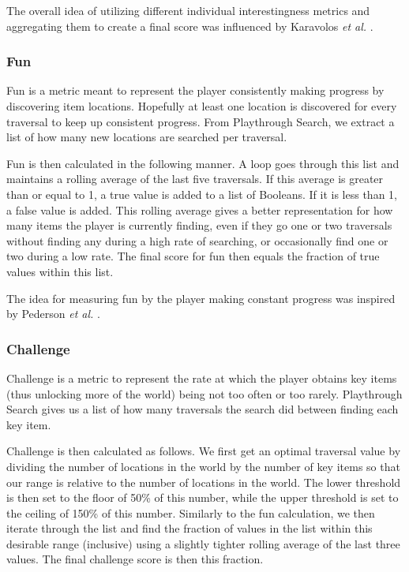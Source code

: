 \documentclass{ieeeaccess}
\begin{document}
The overall idea of utilizing different individual interestingness metrics and aggregating them
to create a final score was influenced by Karavolos {\it et al.} \cite{b3}. 

\subsubsection{Fun}
Fun is a metric meant to represent the player consistently making progress by discovering item
locations. Hopefully at least one location is discovered for every traversal to keep up
consistent progress. From Playthrough Search, we extract a list of how many new locations are
searched per traversal. 

Fun is then calculated in the following manner. A loop goes through this list and maintains a
rolling average of the last five traversals. If this average is greater than or equal to 1, a
true value is added to a list of Booleans. If it is less than 1, a false value is added. This
rolling average gives a better representation for how many items the player is currently
finding, even if they go one or two traversals without finding any during a high rate of
searching, or occasionally find one or two during a low rate. The final score for fun then
equals the fraction of true values within this list.

The idea for measuring fun by the player making constant progress was inspired by Pederson {\it
et al.} \cite{b6}.

\subsubsection{Challenge}
Challenge is a metric to represent the rate at which the player obtains key items (thus
unlocking more of the world) being not too often or too rarely. Playthrough Search gives us a
list of how many traversals the search did between finding each key item. 

Challenge is then calculated as follows. We first get an optimal traversal value by dividing
the number of locations in the world by the number of key items so that our range is relative
to the number of locations in the world. The lower threshold is then set to the floor of 50\%
of this number, while the upper threshold is set to the ceiling of 150\% of this number.
Similarly to the fun calculation, we then iterate through the list and find the fraction of
values in the list within this desirable range (inclusive) using a slightly tighter rolling
average of the last three values. The final challenge score is then this fraction.
\end{document}
